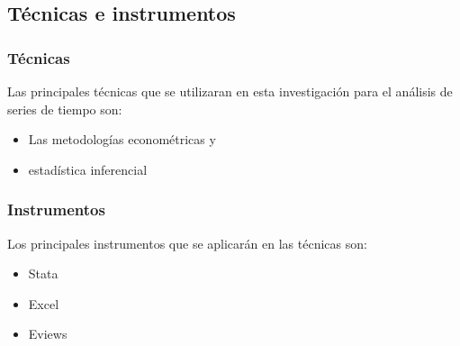 \subsection{Técnicas e instrumentos}

	\subsubsection{Técnicas}
	Las principales técnicas que se utilizaran en esta investigación para el análisis de series de tiempo son:
	\begin{itemize}
	\item Las metodologías econométricas y 
    \item estadística inferencial

    \end{itemize}		
	
	\subsubsection{Instrumentos}
	Los principales instrumentos que se aplicarán en las técnicas son:
	
    \begin{itemize}
    \item Stata
    \item Excel
    \item Eviews

    
    \end{itemize}	
